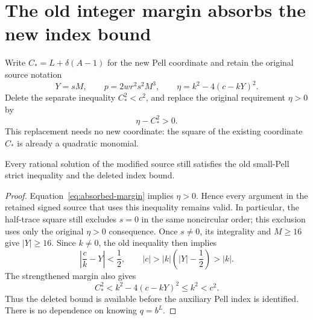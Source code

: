 \section{The old integer margin absorbs the new index bound}
\label{sec:absorbed-bound}

Write \(C_*=L+\delta(A-1)\) for the new Pell coordinate and
retain the original source notation
\[
 Y=sM,\qquad p=2wr^2s^2M^3,\qquad
 \eta=k^2-4(c-kY)^2.
\]
Delete the separate inequality \(C_*^2<c^2\), and replace the
original requirement \(\eta>0\) by
\begin{equation}\label{eq:absorbed-margin}
                  \eta-C_*^2>0.
\end{equation}
This replacement needs no new coordinate: the square of the existing
coordinate \(C_*\) is already a quadratic monomial.

\begin{proposition}
Every rational solution of the modified source still satisfies the
old small-Pell strict inequality and the deleted index bound.
\end{proposition}
\begin{proof}
Equation~\eqref{eq:absorbed-margin} implies \(\eta>0\). Hence every
argument in the retained signed source that uses this inequality
remains valid. In particular, the half-trace square still excludes
\(s=0\) in the same noncircular order; this exclusion uses only
the original \(\eta>0\) consequence. Once \(s\ne0\), its
integrality and \(M\ge16\) give \(|Y|\ge16\). Since \(k\ne0\),
the old inequality then implies
\[
 \left|\frac{c}{k}-Y\right|<\frac12,
 \qquad |c|>|k|\left(|Y|-\frac12\right)>|k|.
\]
The strengthened margin also gives
\[
                 C_*^2<k^2-4(c-kY)^2\le k^2<c^2.
\]
Thus the deleted bound is available before the auxiliary Pell index
is identified. There is no dependence on knowing \(q=b^L\).
\end{proof}

